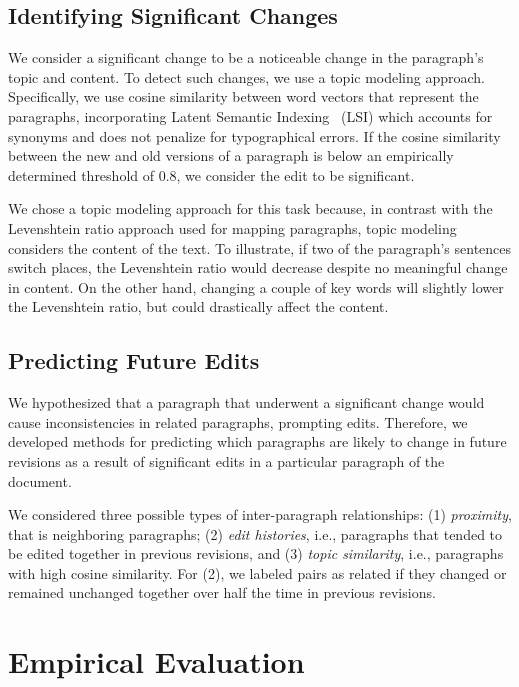 \subsection{Identifying Significant
Changes}\label{identifying-significant-changes}

We consider a significant change to be a noticeable change in the
paragraph's topic and content. To detect such changes, we use a topic
modeling approach. Specifically, we use cosine similarity between word
vectors that represent the paragraphs, incorporating Latent Semantic
Indexing~\cite{deerwester1990indexing} (LSI) which accounts for synonyms
and does not penalize for typographical errors. If the cosine similarity
between the new and old versions of a paragraph is below an empirically
determined threshold of 0.8, we consider the edit to be significant.

We chose a topic modeling approach for this task because, in contrast
with the Levenshtein ratio approach used for mapping paragraphs, topic
modeling considers the content of the text. To illustrate, if two of the
paragraph's sentences switch places, the Levenshtein ratio would
decrease despite no meaningful change in content. On the other hand,
changing a couple of key words will slightly lower the Levenshtein
ratio, but could drastically affect the content.

\subsection{Predicting Future Edits}\label{predicting-future-edits}

We hypothesized that a paragraph that underwent a significant change
would cause inconsistencies in related paragraphs, prompting edits.
Therefore, we developed methods for predicting which paragraphs are
likely to change in future revisions as a result of significant edits in
a particular paragraph of the document.

We considered three possible types of inter-paragraph relationships: (1)
\emph{proximity}, that is neighboring paragraphs; (2) \emph{edit
histories}, i.e., paragraphs that tended to be edited together in
previous revisions, and (3) \emph{topic similarity}, i.e., paragraphs
with high cosine similarity. For (2), we labeled pairs as related if
they changed or remained unchanged together over half the time in
previous revisions.

\section{Empirical Evaluation}\label{empirical-evaluation}

